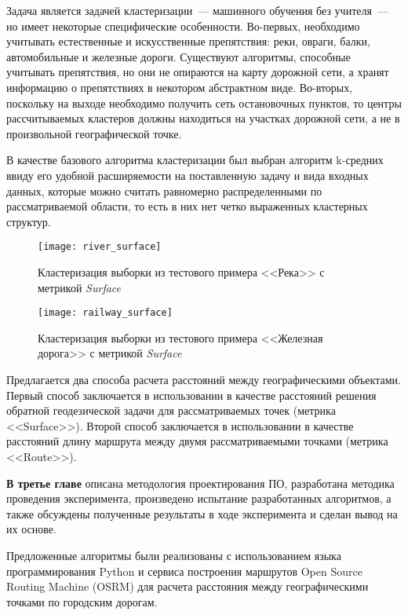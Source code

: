 Задача является задачей кластеризации~--- машинного обучения без учителя~--- но имеет некоторые специфические особенности. Во-первых, необходимо учитывать естественные и искусственные препятствия: реки, овраги, балки, автомобильные и железные дороги. Существуют алгоритмы, способные учитывать препятствия, но они не опираются на карту дорожной сети, а хранят информацию о препятствиях в некотором абстрактном виде. Во-вторых, поскольку на выходе необходимо получить сеть остановочных пунктов, то центры рассчитываемых кластеров должны находиться на участках дорожной сети, а не в произвольной географической точке.

В качестве базового алгоритма кластеризации был выбран алгоритм k-средних ввиду его удобной расширяемости на поставленную задачу и вида входных данных, которые можно считать равномерно распределенными по рассматриваемой области, то есть в них нет четко выраженных кластерных структур.

\begin{figure}[b!]
    \centering
    \texttt{[image: river\_surface]}\\[1ex]
    \parbox{.9\textwidth}{\caption{Кластеризация выборки из тестового примера <<Река>> с метрикой \emph{Surface}} \label{img:river-sur}}
    \texttt{[image: railway\_surface]}\\[1ex]
    \parbox{.9\textwidth}{\caption{Кластеризация выборки из тестового примера <<Железная дорога>> с метрикой \emph{Surface}} \label{img:railway-sur}}
\end{figure}

Предлагается два способа расчета расстояний между географическими объектами. Первый способ заключается в использовании в качестве расстояний решения обратной геодезической задачи для рассматриваемых точек (метрика <<Surface>>). Второй способ заключается в использовании в качестве расстояний длину маршрута между двумя рассматриваемыми точками (метрика <<Route>>).

\textbf{В третье главе} описана методология проектирования ПО, разработана методика проведения эксперимента, произведено испытание разработанных алгоритмов, а также обсуждены полученные результаты в ходе эксперимента и сделан вывод на их основе.

Предложенные алгоритмы были реализованы с использованием языка программирования Python и сервиса построения маршрутов Open Source Routing Machine (OSRM) для расчета расстояния между географическими точками по городским дорогам.

